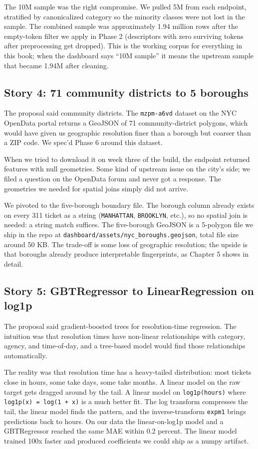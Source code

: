 \documentclass[11pt,letterpaper]{book}
\begin{document}
The 10M sample was the right compromise. We pulled 5M from each endpoint, stratified by canonicalized category so the minority classes were not lost in the sample. The combined sample was approximately 1.94 million rows after the empty-token filter we apply in Phase 2 (descriptors with zero surviving tokens after preprocessing get dropped). This is the working corpus for everything in this book; when the dashboard says ``10M sample'' it means the upstream sample that became 1.94M after cleaning.

\subsection*{Story 4: 71 community districts to 5 boroughs}

The proposal said community districts. The \texttt{mzpm-a6vd} dataset on the NYC OpenData portal returns a GeoJSON of 71 community-district polygons, which would have given us geographic resolution finer than a borough but coarser than a ZIP code. We spec'd Phase 6 around this dataset.

When we tried to download it on week three of the build, the endpoint returned features with null geometries. Some kind of upstream issue on the city's side; we filed a question on the OpenData forum and never got a response. The geometries we needed for spatial joins simply did not arrive.

We pivoted to the five-borough boundary file. The borough column already exists on every 311 ticket as a string (\texttt{MANHATTAN}, \texttt{BROOKLYN}, etc.), so no spatial join is needed: a string match suffices. The five-borough GeoJSON is a 5-polygon file we ship in the repo at \texttt{dashboard/assets/nyc\_boroughs.geojson}, total file size around 50 KB. The trade-off is some loss of geographic resolution; the upside is that boroughs already produce interpretable fingerprints, as Chapter 5 shows in detail.

\subsection*{Story 5: GBTRegressor to LinearRegression on log1p}

The proposal said gradient-boosted trees for resolution-time regression. The intuition was that resolution times have non-linear relationships with category, agency, and time-of-day, and a tree-based model would find those relationships automatically.

The reality was that resolution time has a heavy-tailed distribution: most tickets close in hours, some take days, some take months. A linear model on the raw target gets dragged around by the tail. A linear model on \texttt{log1p(hours)} where \texttt{log1p(x) = log(1 + x)} is a much better fit. The log transform compresses the tail, the linear model finds the pattern, and the inverse-transform \texttt{expm1} brings predictions back to hours. On our data the linear-on-log1p model and a GBTRegressor reached the same MAE within 0.2 percent. The linear model trained 100x faster and produced coefficients we could ship as a numpy artifact.
\end{document}

